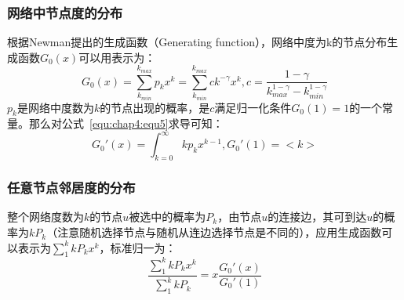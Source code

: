 \subsubsection{网络中节点度的分布}
根据Newman\cite{newman2001random}提出的生成函数（Generating function），网络中度为k的节点分布生成函数$G_0(x)$可以用表示为：
\begin{equation} 
\label{equ:chap4:equ5}
G_{0}(x) = \sum_{k_{min}}^{k_{max}}p_{k}x^{k} = \sum_{k_{min}}^{k_{max}}ck^{-\gamma}x^{k}, c = \frac{1-\gamma}{k_{max}^{1-\gamma}-k_{min}^{1-\gamma}}
\end{equation}
$p_k$是网络中度数为$k$的节点出现的概率，是$c$满足归一化条件$G_0(1)=1$的一个常量。那么对公式~\ref{equ:chap4:equ5}求导可知：
\begin{equation} 
\label{equ:chap4:equ51}
G_{0}'(x) = \int_{k=0}^{\infty}kp_kx^{k-1},G_{0}'(1)=<k>
\end{equation}
\subsubsection{任意节点邻居度的分布}
整个网络度数为$k$的节点$u$被选中的概率为$P_k$，由节点$u$的连接边，其可到达$u$的概率为$kP_k$（注意随机选择节点与随机从连边选择节点是不同的），应用生成函数可以表示为$\sum_{1}^{k}kP_kx^k$，标准归一为：
\begin{equation} 
\label{equ:chap4:equ52}
\frac{\sum_{1}^{k}kP_kx^k}{\sum_{1}^{k}kP_k}=x\frac{G_0'(x)}{G_0'(1)}
\end{equation}


